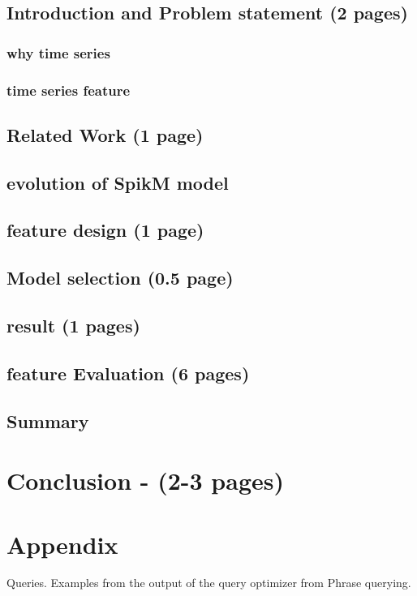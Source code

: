 \documentclass[12pt]{article}
\begin{document}
	\subsection{Introduction and Problem statement (2 pages)}
		\subsubsection{why time series}
 		\subsubsection{time series feature}

	
	\subsection{Related Work (1 page)}
	
	\subsection{evolution of SpikM model }
	
	\subsection{feature design (1 page)}

	\subsection{Model selection (0.5 page)}

	\subsection{result  (1 pages)}

 	\subsection{feature Evaluation (6 pages)}

	\subsection{Summary}
		
	


\section{Conclusion - (2-3 pages)}

\section{Appendix}
	Queries. Examples from the output of the query optimizer from Phrase querying.
\end{document}
